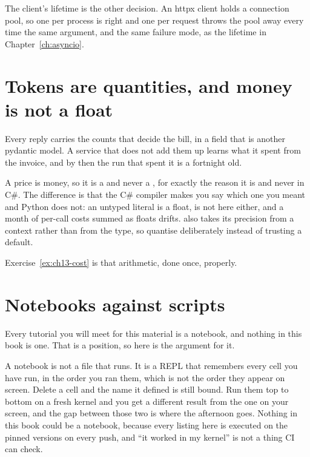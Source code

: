 The client's lifetime is the other decision. An httpx client holds a
connection pool, so one per process is right and one per request throws the
pool away every time \dash{} the same argument, and the same failure mode,
as the  lifetime in Chapter~\ref{ch:asyncio}.

\section{Tokens are quantities, and money is not a float}
\label{sec:ai-tokens}

Every reply carries the counts that decide the bill, in a  field
that is another pydantic model. A service that does not add them up learns
what it spent from the invoice, and by then the run that spent it is a
fortnight old.

\begin{csbox}
A price is money, so it is a  and never a , for
exactly the reason it is  and never  in C\#.
The difference is that the C\# compiler makes you say which one you meant
and Python does not: an untyped literal is a float,  is not
 here either, and a month of per-call costs summed as floats
drifts.  also takes its precision from a context rather than
from the type, so quantise deliberately instead of trusting a default.
\end{csbox}

Exercise~\ref{ex:ch13-cost} is that arithmetic, done once, properly.

\section{Notebooks against scripts}
\label{sec:ai-notebooks}

Every tutorial you will meet for this material is a notebook, and nothing in
this book is one. That is a position, so here is the argument for it.

A notebook is not a file that runs. It is a REPL that remembers every cell
you have run, in the order you ran them, which is not the order they appear
on screen. Delete a cell and the name it defined is still bound. Run them
top to bottom on a fresh kernel and you get a different result from the one
on your screen, and the gap between those two is where the afternoon goes.
Nothing in this book could be a notebook, because every listing here is
executed on the pinned versions on every push, and \enquote{it worked in my
kernel} is not a thing CI can check.

